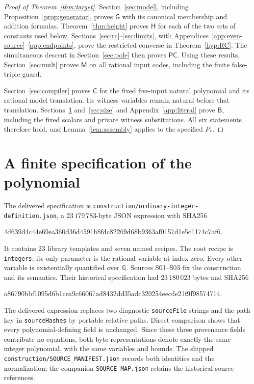 \documentclass[11pt]{article}
\theoremstyle{definition}
\theoremstyle{remark}
\newcommand{\Q}{\mathbb Q}
\begin{document}
\begin{proof}[Proof of Theorem~\ref{thm:target}]
Section~\ref{sec:model}, including Proposition~\ref{prop:generator},
proves $\mathsf G$ with its canonical membership and addition formulas.
Theorem~\ref{thm:height} proves $\mathsf H$ for each of the two sets of
constants used below. Sections~\ref{sec:rc}--\ref{sec:limits}, with
Appendices~\ref{app:even-source}--\ref{app:endpoints}, prove the restricted
converse in Theorem~\ref{hyp:RC}. The simultaneous descent in
Section~\ref{sec:pole} then proves $\mathsf{PC}$. Using these results,
Section~\ref{sec:mult} proves $\mathsf M$ on all rational input codes,
including the finite false-triple guard.

Section~\ref{sec:compiler} proves $\mathsf C$ for the fixed five-input
natural polynomial and its rational model translation. Its witness
variables remain natural before that translation. Sections~\ref{sec:syntax}
and~\ref{sec:size} and Appendix~\ref{app:literal} prove $\mathsf B$, including
the fixed scalars and private witness substitutions. All six statements
therefore hold, and Lemma~\ref{lem:assembly} applies to the specified $P_*$.
\end{proof}

\section{A finite specification of the polynomial}\label{sec:syntax}
The delivered specification is
\nolinkurl{construction/ordinary-integer-definition.json}, a
$23\,179\,783$-byte JSON expression with SHA256
\begin{center}\small\ttfamily
4d639d4c44e69ea360d36d4591b8fdc82269d68b9363af0157d1e5c1174c7af6.
\end{center}
It contains 23 library templates and seven named recipes. The root recipe
is \texttt{integers}; its only parameter is the rational variable at index
zero. Every other variable is existentially quantified over $\Q$.
Sources S01--S03 fix the construction and its semantics. Their historical
specification had $23\,180\,023$ bytes and SHA256
\begin{center}\small\ttfamily
a86790bbf1095d6b1cea9c66067ad8432dd35adc320254eecde21f9f98574714.
\end{center}
The delivered expression replaces two diagnostic \texttt{sourceFile}
strings and the path key in \texttt{sourceHashes} by portable relative
paths. Direct comparison shows that every polynomial-defining field is
unchanged. Since these three provenance fields contribute no equations,
both byte representations denote exactly the same integer polynomial,
with the same variables and bounds. The shipped
\nolinkurl{construction/SOURCE_MANIFEST.json} records both identities and
the normalization; the companion \texttt{SOURCE\_MAP.json} retains the
historical source references.
\end{document}
